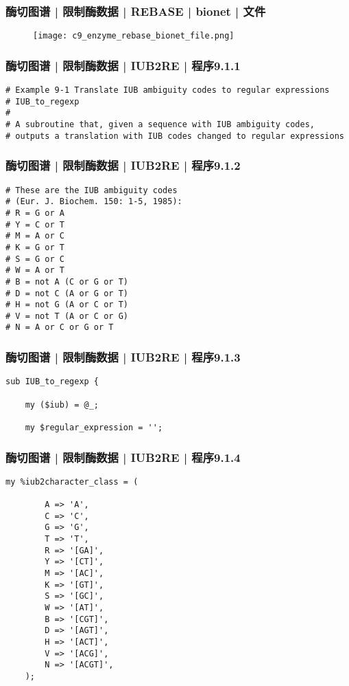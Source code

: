 \begin{frame}
  \frametitle{酶切图谱 | 限制酶数据 | REBASE | bionet | 文件}
  \begin{figure}
    \centering
    \texttt{[image: c9\_enzyme\_rebase\_bionet\_file.png]}
  \end{figure}
\end{frame}

\begin{frame}[fragile]
  \frametitle{酶切图谱 | 限制酶数据 | IUB2RE | 程序9.1.1}
\begin{lstlisting}
# Example 9-1 Translate IUB ambiguity codes to regular expressions
# IUB_to_regexp
#
# A subroutine that, given a sequence with IUB ambiguity codes,
# outputs a translation with IUB codes changed to regular expressions
\end{lstlisting}
\end{frame}

\begin{frame}[fragile]
  \frametitle{酶切图谱 | 限制酶数据 | IUB2RE | 程序9.1.2}
\begin{lstlisting}[firstnumber=7]
# These are the IUB ambiguity codes
# (Eur. J. Biochem. 150: 1-5, 1985):
# R = G or A
# Y = C or T
# M = A or C
# K = G or T
# S = G or C
# W = A or T
# B = not A (C or G or T)
# D = not C (A or G or T)
# H = not G (A or C or T)
# V = not T (A or C or G)
# N = A or C or G or T
\end{lstlisting}
\end{frame}

\begin{frame}[fragile]
  \frametitle{酶切图谱 | 限制酶数据 | IUB2RE | 程序9.1.3}
\begin{lstlisting}[firstnumber=21]
sub IUB_to_regexp {

    my ($iub) = @_;

    my $regular_expression = '';
\end{lstlisting}
\end{frame}

\begin{frame}[fragile]
  \frametitle{酶切图谱 | 限制酶数据 | IUB2RE | 程序9.1.4}
  \vspace{-0.6em}
\begin{lstlisting}[firstnumber=27,basicstyle=\small\tt,numberstyle=\footnotesize]
    my %iub2character_class = (

        A => 'A',
        C => 'C',
        G => 'G',
        T => 'T',
        R => '[GA]',
        Y => '[CT]',
        M => '[AC]',
        K => '[GT]',
        S => '[GC]',
        W => '[AT]',
        B => '[CGT]',
        D => '[AGT]',
        H => '[ACT]',
        V => '[ACG]',
        N => '[ACGT]',
    );
\end{lstlisting}
\end{frame}

